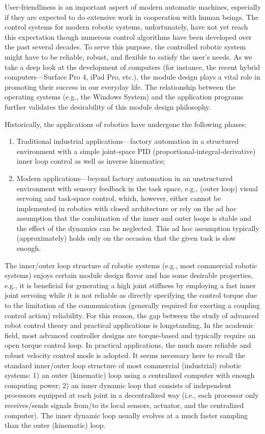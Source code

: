 \documentclass[9pt,technote]{IEEEtran}
\begin{document}
User-friendliness is an important aspect of modern automatic machines, especially if they are expected to do extensive work in cooperation with human beings. The control systems for modern robotic systems, unfortunately, have not yet reach this expectation though numerous control algorithms have been developed over the past several decades. To serve this purpose, the controlled robotic system might have to be reliable, robust, and flexible to satisfy the user's needs. As we take a deep look at the development of computers (for instance, the recent hybrid computers---Surface Pro 4, iPad Pro, etc.), the module design plays a vital role in promoting their success in our everyday life. The relationship between the operating systems (e.g., the Windows System) and the application programs further validates the desirability of this module design philosophy.

Historically, the applications of robotics have undergone the following phases:
\begin{enumerate}

\item Traditional industrial applications---factory automation in a structured environment with a simple joint-space PID (proportional-integral-derivative) inner loop control as well as inverse kinematics;

\item Modern applications---beyond factory automation in an unstructured environment with sensory feedback in the task space, e.g., (outer loop) visual servoing and task-space control, which, however, either cannot be implemented in robotics with closed architecture or rely on the ad hoc assumption that the combination of the inner and outer loops is stable and the effect of the dynamics can be neglected. This ad hoc assumption typically (approximately) holds only on the occasion that the given task is slow enough.

\end{enumerate}
The inner/outer loop structure of robotic systems (e.g., most commercial robotic systems) enjoys certain module design flavor and has some desirable properties, e.g., it is beneficial for generating a high joint stiffness by employing a fast inner joint servoing while it is not reliable as directly specifying the control torque due to the limitation of the communication (generally required for exerting a coupling control action) reliability. For this reason, the gap between the study of advanced robot control theory and practical applications is longstanding. In the academic field, most advanced controller designs are torque-based and typically require an open torque control loop. In practical applications, the much more reliable and robust velocity control mode is adopted. It seems necessary here to recall the {standard inner/outer loop structure} of most commercial (industrial) robotic systems: 1) an outer (kinematic) loop using a centralized computer with enough computing power;  2) an inner dynamic loop that consists of  independent processors equipped at each joint in a decentralized way (i.e., each processor only receives/sends signals from/to its local sensors, actuator, and the centralized computer). The inner dynamic loop usually evolves at a much faster sampling than the outer (kinematic) loop.
\end{document}
